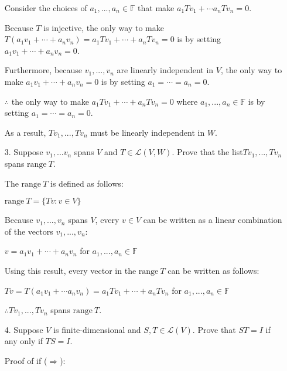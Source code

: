 \documentclass[fleqn]{article}
\begin{document}
\begin{enumerate}[nolistsep]
			
			
			Consider the choices of $a_1,...,a_n \in \mathbb{F}$ that make $a_1Tv_1 + \cdots a_nTv_n = 0$.
			
			
			Because $T$ is injective, the only way to make $T(a_1v_1 + \cdots + a_nv_n) = a_1Tv_1 + \cdots + a_nTv_n = 0$ is by setting $a_1v_1 + \cdots + a_nv_n = 0$.
			
			Furthermore, because $v_1,...,v_n$ are linearly independent in $V$, the only way to make $a_1v_1 + \cdots + a_nv_n = 0$ is by setting	$a_1 = \cdots = a_n = 0$.
			
			$\therefore$ the only way to make $a_1Tv_1 + \cdots + a_nTv_n = 0$ where $a_1,...,a_n \in \mathbb{F}$ is by setting $a_1 = \cdots = a_n = 0$.
			
			As a result, $Tv_1,...,Tv_n$ must be linearly independent in $W$.
	
		\item[3.] Suppose $v_1,...v_n$ spans $V$ and $T \in \mathcal{L}(V,W)$. Prove that the list\newline $Tv_1,...,Tv_n$ spans $\text{range}\ T$.

		The $\text{range}\ T$ is defined as follows:
		
		$\text{range}\ T = \{Tv : v \in V\}$
		
		Because $v_1,...,v_n$ spans $V$, every $v \in V$ can be written as a linear combination of the vectors $v_1,...,v_n$:
		
		$v = a_1v_1 + \cdots + a_nv_n$ for $a_1,...,a_n \in \mathbb{F}$
		
		Using this result, every vector in the $\text{range}\ T$ can be written as follows:
		
		$Tv = T(a_1v_1 + \cdots a_nv_n) = a_1Tv_1 + \cdots + a_nTv_n$ for $a_1,...,a_n \in \mathbb{F}$
		
		$\therefore Tv_1,...,Tv_n$ spans $\text{range}\ T$.
		
		\item[4.] Suppose $V$ is finite-dimensional and $S,T \in \mathcal{L}(V)$. Prove that $ST = I$ if any only if $TS = I$.
		
	Proof of if ($\Rightarrow$):
	

\end{enumerate}
\end{document}
